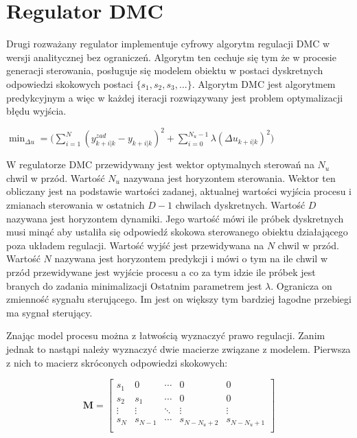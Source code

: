 \documentclass[a4paper,titlepage,11pt,floatssmall]{mwrep}
\begin{document}
\section{Regulator DMC}
Drugi rozważany regulator implementuje cyfrowy algorytm regulacji DMC w wersji analitycznej bez ograniczeń. Algorytm ten cechuje się tym że w procesie generacji sterowania, posługuje się modelem obiektu w postaci dyskretnych odpowiedzi skokowych postaci $\{s_1, s_2, s_3, ...\}$. Algorytm DMC jest algorytmem predykcyjnym a więc w każdej iteracji rozwiązywany jest problem optymalizacji błędu wyjścia.

\begin{center}

$\min_{\Delta u} = \bigg( \sum_{i=1}^{N}(y_{k+i|k}^{zad} - y_{k+i|k})^2 + \sum_{i=0}^{N_{u} - 1}\lambda(\Delta u_{k+i|k})^2 \bigg)$

\end{center}

W regulatorze DMC przewidywany jest wektor optymalnych sterowań na $N_u$ chwil w przód. Wartość $N_u$ nazywana jest horyzontem sterowania. Wektor ten obliczany jest na podstawie wartości zadanej, aktualnej wartości wyjścia procesu i zmianach sterowania w ostatnich $D-1$ chwilach dyskretnych. Wartość $D$ nazywana jest horyzontem dynamiki. Jego wartość mówi ile próbek dyskretnych musi minąć aby ustaliła się odpowiedź skokowa sterowanego obiektu działającego poza układem regulacji. Wartość wyjść jest przewidywana na $N$ chwil w przód. Wartość $N$ nazywana jest horyzontem predykcji i mówi o tym na ile chwil w przód przewidywane jest wyjście procesu a co za tym idzie ile próbek jest branych do zadania minimalizacji Ostatnim parametrem jest $\lambda$. Ogranicza on zmienność sygnału sterującego. Im jest on większy tym bardziej łagodne przebiegi ma sygnał sterujący.\\
\newpage

Znając model procesu można z łatwością wyznaczyć prawo regulacji. Zanim jednak to nastąpi należy wyznaczyć dwie macierze związane z modelem. Pierwsza z nich to macierz skróconych odpowiedzi skokowych:

$$
\mathbf{M} =
\left[ \begin{array}{ccccc}
s_1 & 0 & \cdots & 0 & 0\\
s_2 & s_1 & \cdots & 0 & 0\\
\vdots & \vdots & \ddots & \vdots & \vdots  \\
s_N & s_{N-1} & \cdots & s_{N - N_u + 2}& s_{N - N_u + 1}\\
\end{array} \right]
$$
\end{document}
